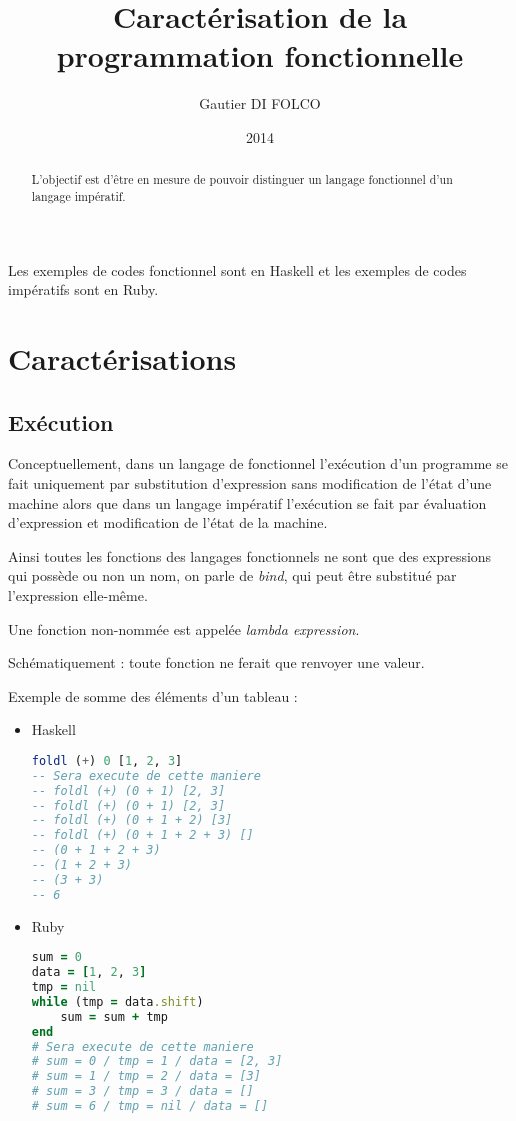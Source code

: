 \documentclass{article}
\title{Caractérisation de la programmation fonctionnelle}
\author{Gautier DI FOLCO}
\date{2014}
\begin{document}
\maketitle
\tableofcontents

\begin{abstract}
L'objectif est d'être en mesure de pouvoir distinguer un langage fonctionnel
d'un langage impératif.
\end{abstract}

Les exemples de codes fonctionnel sont en Haskell et les exemples de codes impératifs sont en Ruby.

\section{Caractérisations}
\subsection{Exécution}
Conceptuellement, dans un langage de fonctionnel l’exécution d’un programme se
fait uniquement par substitution d’expression sans modification de l’état d’une
machine alors que dans un langage impératif l’exécution se fait par évaluation
d’expression et modification de l’état de la machine.

Ainsi toutes les fonctions des langages fonctionnels ne sont que des expressions
qui possède ou non un nom, on parle de \emph{bind}, qui peut être substitué par
l'expression elle-même.

Une fonction non-nommée est appelée \emph{lambda expression}.

Schématiquement : toute fonction ne ferait que renvoyer une valeur.

Exemple de somme des éléments d'un tableau :

\begin{itemize}
    \item Haskell

\begin{lstlisting}[language=haskell]
foldl (+) 0 [1, 2, 3]
-- Sera execute de cette maniere
-- foldl (+) (0 + 1) [2, 3]
-- foldl (+) (0 + 1) [2, 3]
-- foldl (+) (0 + 1 + 2) [3]
-- foldl (+) (0 + 1 + 2 + 3) []
-- (0 + 1 + 2 + 3)
-- (1 + 2 + 3)
-- (3 + 3)
-- 6
\end{lstlisting}

    \item Ruby

\begin{lstlisting}[language=ruby]
sum = 0
data = [1, 2, 3]
tmp = nil
while (tmp = data.shift)
    sum = sum + tmp
end
# Sera execute de cette maniere
# sum = 0 / tmp = 1 / data = [2, 3]
# sum = 1 / tmp = 2 / data = [3]
# sum = 3 / tmp = 3 / data = []
# sum = 6 / tmp = nil / data = []
\end{lstlisting}
\end{itemize}
\end{document}
